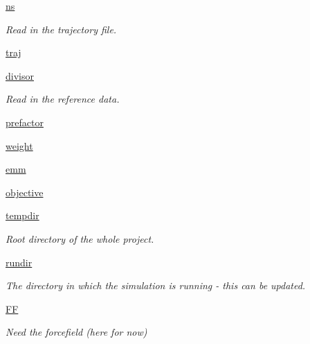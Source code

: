 \begin{DoxyCompactItemize}
\item 
\hyperlink{classforcebalance_1_1interaction_1_1Interaction_ac1f6c5f3016ee6c1e7f847a61326e984}{ns}
\begin{DoxyCompactList}\small\item\em \-Read in the trajectory file. \end{DoxyCompactList}\item 
\hyperlink{classforcebalance_1_1interaction_1_1Interaction_a3deec07ef2fea43d2282c0a2831e3a53}{traj}
\item 
\hyperlink{classforcebalance_1_1interaction_1_1Interaction_a5acc08fd127025be41f07108089c6ad0}{divisor}
\begin{DoxyCompactList}\small\item\em \-Read in the reference data. \end{DoxyCompactList}\item 
\hyperlink{classforcebalance_1_1interaction_1_1Interaction_a3f8576282adfd82b056b20a3d930c022}{prefactor}
\item 
\hyperlink{classforcebalance_1_1interaction_1_1Interaction_a44f014dd322e410a37dd453f99d879ba}{weight}
\item 
\hyperlink{classforcebalance_1_1interaction_1_1Interaction_ae8e2bf3b78d9f44929f7f50dcf90b1db}{emm}
\item 
\hyperlink{classforcebalance_1_1interaction_1_1Interaction_a60e39bdee6c2aea725be0cc1c232a47e}{objective}
\item 
\hyperlink{classforcebalance_1_1target_1_1Target_aede2856573b890cd47054ad36937d6f6}{tempdir}
\begin{DoxyCompactList}\small\item\em \-Root directory of the whole project. \end{DoxyCompactList}\item 
\hyperlink{classforcebalance_1_1target_1_1Target_a1da470037ef61c22dc44beb85cfa01a9}{rundir}
\begin{DoxyCompactList}\small\item\em \-The directory in which the simulation is running -\/ this can be updated. \end{DoxyCompactList}\item 
\hyperlink{classforcebalance_1_1target_1_1Target_a796dc30a19a60c63fb43b088d40a963f}{\-F\-F}
\begin{DoxyCompactList}\small\item\em \-Need the forcefield (here for now) \end{DoxyCompactList}\item 

\end{DoxyCompactItemize}
